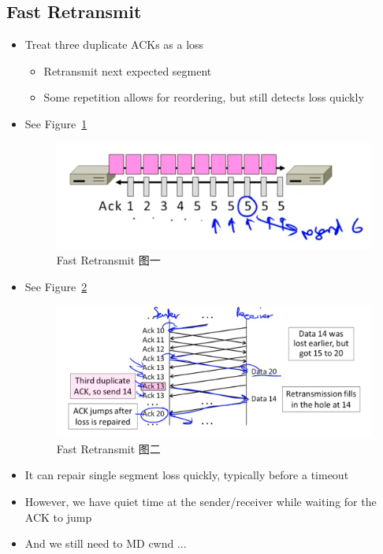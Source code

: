 \documentclass[12pt]{ctexart}   %
\begin{document}
	\subsection{Fast Retransmit}
	\begin{itemize}
		\item Treat three duplicate ACKs as a loss
		\begin{itemize}
			\item Retransmit next expected segment
			\item Some repetition allows for reordering, but still detects loss quickly
		\end{itemize}
		\item See Figure~\ref{fig:7-7-2}
		  
		 \begin{figure}[h!] %
		\centering
		 \includegraphics[scale=0.7]{images/7-7-2}
		\caption{ Fast Retransmit 图一}
		 \label{fig:7-7-2}
		 \end{figure}
		 \item See Figure~\ref{fig:7-7-3}
		  
		 \begin{figure}[h!] %
		\centering
		 \includegraphics[scale=0.7]{images/7-7-3}
		\caption{ Fast Retransmit 图二 }
		 \label{fig:7-7-3}
		 \end{figure}
		 
		 \item It can repair single segment loss quickly, typically before a timeout
		\item However, we have quiet time at the sender/receiver while waiting for the ACK to jump
		\item And we still need to MD cwnd ...	 
	\end{itemize}
	
\end{document}
